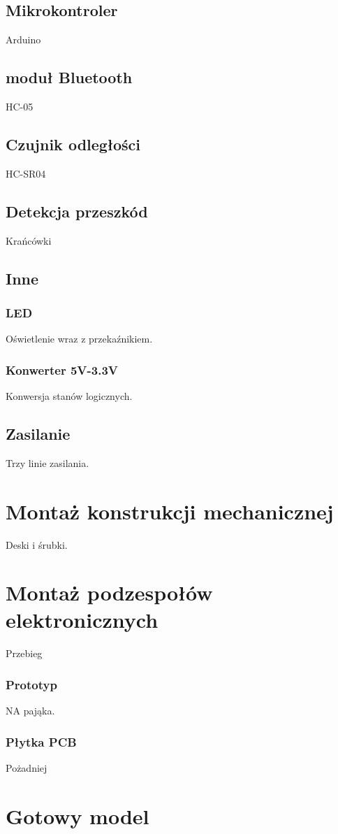 \documentclass[../main.tex]{subfiles}
\begin{document}
\subsection{Mikrokontroler}
Arduino

\subsection{moduł Bluetooth}
HC-05

\subsection{Czujnik odległości}
HC-SR04

\subsection{Detekcja przeszkód}
Krańcówki

\subsection{Inne}
\subsubsection{LED}
Oświetlenie wraz z przekaźnikiem.

\subsubsection{Konwerter 5V-3.3V}
Konwersja stanów logicznych.

\subsection{Zasilanie}
Trzy linie zasilania.

\section{Montaż konstrukcji mechanicznej}
Deski i śrubki.

\section{Montaż podzespołów elektronicznych}
Przebieg
\subsubsection{Prototyp}
NA pająka.
\subsubsection{Płytka PCB}
Pożadniej

\section{Gotowy model}
\end{document}
